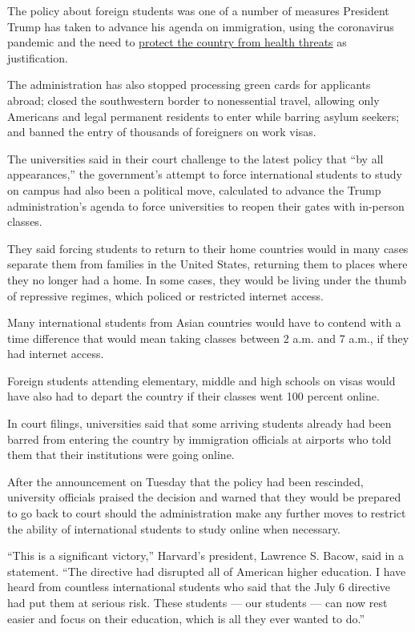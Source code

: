 The policy about foreign students was one of a number of measures
President Trump has taken to advance his agenda on immigration, using
the coronavirus pandemic and the need to
\href{https://www.nytimes.com/2020/05/03/us/coronavirus-immigration-stephen-miller-public-health.html}{protect
the country from health threats} as justification.

The administration has also stopped processing green cards for
applicants abroad; closed the southwestern border to nonessential
travel, allowing only Americans and legal permanent residents to enter
while barring asylum seekers; and banned the entry of thousands of
foreigners on work visas.

The universities said in their court challenge to the latest policy that
``by all appearances,'' the government's attempt to force international
students to study on campus had also been a political move, calculated
to advance the Trump administration's agenda to force universities to
reopen their gates with in-person classes.

They said forcing students to return to their home countries would in
many cases separate them from families in the United States, returning
them to places where they no longer had a home. In some cases, they
would be living under the thumb of repressive regimes, which policed or
restricted internet access.

Many international students from Asian countries would have to contend
with a time difference that would mean taking classes between 2 a.m. and
7 a.m., if they had internet access.

Foreign students attending elementary, middle and high schools on visas
would have also had to depart the country if their classes went 100
percent online.

In court filings, universities said that some arriving students already
had been barred from entering the country by immigration officials at
airports who told them that their institutions were going online.

After the announcement on Tuesday that the policy had been rescinded,
university officials praised the decision and warned that they would be
prepared to go back to court should the administration make any further
moves to restrict the ability of international students to study online
when necessary.

``This is a significant victory,'' Harvard's president, Lawrence S.
Bacow, said in a statement. ``The directive had disrupted all of
American higher education. I have heard from countless international
students who said that the July 6 directive had put them at serious
risk. These students --- our students --- can now rest easier and focus
on their education, which is all they ever wanted to do.''

